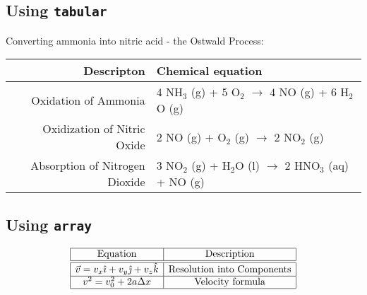 \documentclass{article}
\begin{document}
\subsection{Using {\tt tabular}} %
Converting ammonia into nitric acid - the Ostwald Process\cite{Ostwald}:
\\
\begin{center}
\begin{tabular}{ r | l}
Descripton & Chemical equation \\ \hline
Oxidation of Ammonia & $4$ NH$_3$ (g) + $5$ O$_2$ $\rightarrow$ $4$ NO (g) + $6$ H$_2$O (g) \\
Oxidization of Nitric Oxide & 2 NO (g) + O$_2$ (g) $\rightarrow$ 2 NO$_2$ (g) \\
Absorption of Nitrogen Dioxide & 3 NO$_2$ (g) + H$_2$O (l) $\rightarrow$ 2 HNO$_3$ (aq) + NO (g) \\
\end{tabular}
\end{center}
\subsection{Using {\tt array}} %
\begin{center}
\renewcommand{\arraystretch}{1.5} 
\[
\begin{array}{|c|c|} \hline
\mbox{Equation} & \mbox{Description} \\
\hline
\hline
\vec{v}=v_x\hat{\imath}+v_y\hat{\jmath}+v_z\hat{k}  & \mbox{Resolution into Components} \\ \hline
v^2=v_0^2+2a\Delta x & \mbox{Velocity formula} \\ \hline
\end{array} \]
\end{center} 
\pagebreak
\end{document}
